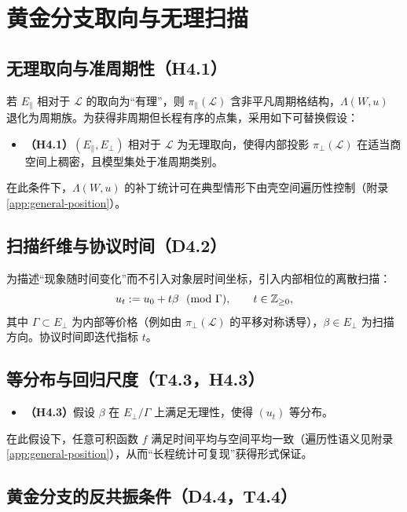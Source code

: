\section{黄金分支取向与无理扫描}\label{sec:golden-branch}

\subsection{无理取向与准周期性（H4.1）}

若 $E_{\parallel}$ 相对于 $\mathcal{L}$ 的取向为“有理”，则 $\pi_{\parallel}(\mathcal{L})$ 含非平凡周期格结构，$\Lambda(W,u)$ 退化为周期族。为获得非周期但长程有序的点集，采用如下可替换假设：
\begin{itemize}
  \item \textbf{（H4.1）}$(E_{\parallel},E_{\perp})$ 相对于 $\mathcal{L}$ 为无理取向，使得内部投影 $\pi_{\perp}(\mathcal{L})$ 在适当商空间上稠密，且模型集处于准周期类别。
\end{itemize}
在此条件下，$\Lambda(W,u)$ 的补丁统计可在典型情形下由壳空间遍历性控制（附录 \ref{app:general-position}）。

\subsection{扫描纤维与协议时间（D4.2）}

为描述“现象随时间变化”而不引入对象层时间坐标，引入内部相位的离散扫描：
\[
u_t:=u_0+t\beta \ \ (\mathrm{mod}\ \Gamma),\qquad t\in\ZZ_{\ge 0},
\]
其中 $\Gamma\subset E_{\perp}$ 为内部等价格（例如由 $\pi_{\perp}(\mathcal{L})$ 的平移对称诱导），$\beta\in E_{\perp}$ 为扫描方向。协议时间即迭代指标 $t$。

\subsection{等分布与回归尺度（T4.3，H4.3）}

\begin{itemize}
  \item \textbf{（H4.3）}假设 $\beta$ 在 $E_{\perp}/\Gamma$ 上满足无理性，使得 $(u_t)$ 等分布。
\end{itemize}
在此假设下，任意可积函数 $f$ 满足时间平均与空间平均一致（遍历性语义见附录 \ref{app:general-position}），从而“长程统计可复现”获得形式保证。

\subsection{黄金分支的反共振条件（D4.4，T4.4）}

